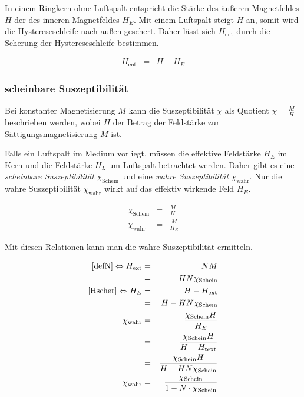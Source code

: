 \documentclass[12pt,a4paper]{scrartcl}
\numberwithin{equation}{section} %
\renewcommand{\[}{} %
\renewcommand{\]}{\noindent} %
\begin{document}
In einem Ringkern ohne Luftspalt entspricht die Stärke des äußeren
Magnetfeldes \(H\) der des inneren Magnetfeldes \(H_E\). Mit einem
Luftspalt steigt \(H\) an, somit wird die Hystereseschleife nach außen
geschert. Daher lässt sich \(H_\mathrm{ent}\) durch die Scherung der
Hystereseschleife bestimmen.

\[
\begin{eqnarray}
    H_\mathrm{ent} &=& H - H_E \label{Hscher}
\end{eqnarray}
\]

\hypertarget{scheinbare-suszeptibilituxe4t}{%
\subsubsection{scheinbare
Suszeptibilität}\label{scheinbare-suszeptibilituxe4t}}

Bei konstanter Magnetisierung \(M\) kann die Suszeptibilität \(\chi\)
als Quotient \(\chi = \frac{M}{H}\) beschrieben werden, wobei \(H\) der
Betrag der Feldstärke zur Sättigungsmagnetisierung \(M\) ist.

Falls ein Luftspalt im Medium vorliegt, müssen die effektive Feldstärke
\(H_E\) im Kern und die Feldstärke \(H_L\) um Luftspalt betrachtet
werden. Daher gibt es eine \emph{scheinbare Suszeptibilität}
\(\chi_\mathrm{Schein}\) und eine \emph{wahre Suszeptibilität}
\(\chi_\mathrm{wahr}\). Nur die wahre Suszeptibilität
\(\chi_\mathrm{wahr}\) wirkt auf das effektiv wirkende Feld \(H_E\).

\[
\begin{eqnarray}
    \chi_\mathrm{Schein} &=& \frac{M}{H} \\
    \chi_\mathrm{wahr} &=& \frac{M}{H_E}
\end{eqnarray}
\]

Mit diesen Relationen kann man die wahre Suszeptibilität ermitteln.

\[
\begin{eqnarray}
    \eqref{defN} \Leftrightarrow H_\mathrm{ext} &=& NM
        \nonumber \\
        &=& HN\chi_\mathrm{Schein}
        \nonumber \\
    \eqref{Hscher} \Leftrightarrow H_E &=& H - H_\mathrm{ext}
        \nonumber \\
        &=& H - HN\chi_\mathrm{Schein}
        \nonumber \\
    \chi_\mathrm{wahr}
        &=& \frac{\chi_\mathrm{Schein} H}{H_E}
        \nonumber \\
        &=& \frac{\chi_\mathrm{Schein} H}{H - H_\mathrm{text}}
        \nonumber \\
        &=& \frac{\chi_\mathrm{Schein} H}{H - HN\chi_\mathrm{Schein}}
        \nonumber \\
    \chi_\mathrm{wahr}
        &=& \frac{\chi_\mathrm{Schein}}{1 - N\cdot\chi_\mathrm{Schein}} \label{ChiWahr}
\end{eqnarray}
\]
\end{document}
